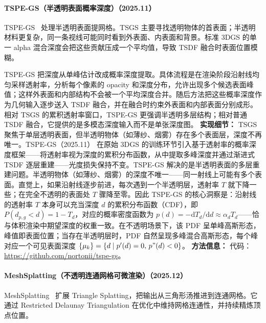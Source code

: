 \paragraph{TSPE-GS（半透明表面概率深度）（2025.11）}
TSPE-GS~\cite{2511_09944} 处理半透明表面提网格。TSGS 主要寻找透明物体的首表面；半透明材料更复杂，同一条视线可能同时看到外表面、内表面和背景。标准 3DGS 的单一 alpha 混合深度会把这些贡献压成一个平均值，导致 TSDF 融合时表面位置模糊。

TSPE-GS 把深度从单峰估计改成概率深度提取。具体流程是在渲染阶段沿射线均匀采样透射率，分析每个像素的 opacity 和深度分布，允许出现多个候选表面峰值；这样外表面和内部结构不会被一个平均深度合并。随后方法把这些概率深度作为几何输入逐步送入 TSDF 融合，并在融合时约束外表面和内部表面分别成形。相对 TSGS 的累积透射率窗口，TSPE-GS 更强调半透明多层结构；相对普通 TSDF 融合，它提供的是多模态深度输入而不是单张深度图。
\textbf{实现细节：} TSGS 聚焦于单层透明表面，但半透明物体（如薄纱、烟雾）存在多个表面层，深度不再唯一。TSPE-GS（2025.11） 在原始 3DGS 的训练环节引入基于透射率的概率深度框架——将透射率视为深度的累积分布函数，从中提取多峰深度并通过渐进式 TSDF 逐层重建——光度损失保持不变。TSPE-GS 解决的是半透明表面的多层重建问题。半透明物体（如薄纱、烟雾）的深度不唯一——同一射线上可能有多个表面。直觉上，如果沿射线逐步前进，每次遇到一个半透明层，透射率 $T$ 就下降一些；在完全不透明的表面处 $T$ 骤降至零。因此 TSPE-GS 的核心洞察是：沿射线的透射率 $T$ 本身可以充当深度 $d$ 的累积分布函数（CDF），即 $P(d_{p,g} < d) = 1 - T_d$，对应的概率密度函数为 $p(d) = -\mathrm{d}T_d / \mathrm{d}d \approx \alpha_d T_d$——恰与体积渲染中期望深度的权重一致。在不透明场景下，该 PDF 呈单峰高斯形态，峰值即表面位置；当存在半透明层时，PDF 自然呈现多峰混合高斯形态，每个峰对应一个可见表面深度 $\{\mu_k\} = \{d \mid p'(d) = 0, \, p"(d) < 0\}$。
\textbf{方法信息：} 代码：\url{https://github.com/nortonii/tspe-gs}。



\paragraph{MeshSplatting（不透明连通网格可微渲染）（2025.12）}
MeshSplatting~\cite{2512_06818} 扩展 Triangle Splatting，把输出从三角形汤推进到连通网格。它通过 Restricted Delaunay Triangulation 在优化中维持网格连通性，并持续精炼顶点位置。

